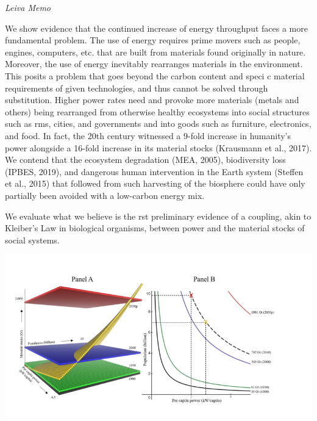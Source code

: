 \documentclass[
]{book}
\begin{document}
\emph{Leiva Memo}

We show evidence that the continued increase of energy throughput faces a more fundamental problem.
The use of energy requires prime movers such as people, engines, computers, etc. that are built from
materials found originally in nature. Moreover, the use of energy inevitably rearranges materials in the
environment. This posits a problem that goes beyond the carbon content and speci c material
requirements of given technologies, and thus cannot be solved through substitution. Higher power rates
need and provoke more materials (metals and others) being rearranged from otherwise healthy
ecosystems into social structures such as rms, cities, and governments and into goods such as
furniture, electronics, and food. In fact, the 20th century witnessed a 9-fold increase in humanity's power
alongside a 16-fold increase in its material stocks (Krausmann et al., 2017). We contend that the
ecosystem degradation (MEA, 2005), biodiversity loss (IPBES, 2019), and dangerous human intervention
in the Earth system (Steffen et al., 2015) that followed from such harvesting of the biosphere could have
only partially been avoided with a low-carbon energy mix.

We evaluate what we believe is the rst preliminary evidence of a coupling, akin to Kleiber's Law in
biological organisms, between power and the material stocks of social systems.

\includegraphics{fig/Leiva_Kleiber.png}
\end{document}
